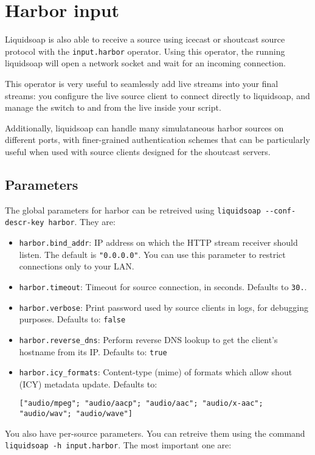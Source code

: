 \section{Harbor input}
Liquidsoap is also able to receive a source using icecast or shoutcast source protocol with 
the \verb+input.harbor+ operator. Using this operator, the running liquidsoap will open 
a network socket and wait for an incoming connection.

This operator is very useful to seamlessly add live streams
into your final streams:
you configure the live source client to connect directly to liquidsoap,
and manage the switch to and from the live inside your script.

Additionally, liquidsoap can handle many simulataneous harbor sources on different ports, 
with finer-grained authentication schemes that can be particularly useful when used with
source clients designed for the shoutcast servers.

\subsection{Parameters}
The global parameters for harbor can be retreived using
\verb+liquidsoap --conf-descr-key harbor+. They are:

\begin{itemize}
\item \verb+harbor.bind_addr+: IP address on which the HTTP stream receiver should listen. The default is \verb+"0.0.0.0"+. You can use this parameter to restrict connections only to your LAN.
\item \verb+harbor.timeout+: Timeout for source connection, in seconds. Defaults to \verb+30.+.
\item \verb+harbor.verbose+: Print password used by source clients in logs, for debugging purposes. Defaults to: \verb+false+
\item \verb+harbor.reverse_dns+: Perform reverse DNS lookup to get the client's hostname from its IP. Defaults to: \verb+true+
\item \verb+harbor.icy_formats+: Content-type (mime) of formats which allow shout (ICY) metadata update. Defaults to: \begin{verbatim}
["audio/mpeg"; "audio/aacp"; "audio/aac"; "audio/x-aac"; "audio/wav"; "audio/wave"]
\end{verbatim}


\end{itemize}
You also have per-source parameters. You can retreive them using the command 
\verb+liquidsoap -h input.harbor+. The most important one are:

